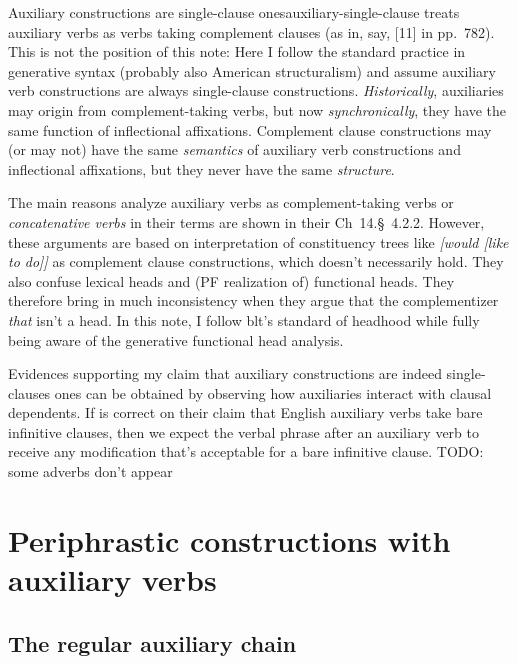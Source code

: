 \documentclass[UTF8, a4paper, oneside, scheme=plain]{ctexrep}
\newcommand*{\citesec}[1]{\S~{#1}}
\newcommand*{\citechap}[1]{Ch~{#1}}
\newcommand*{\citepage}[1]{pp.~{#1}}
\newcommand*{\citechapsec}[2]{\citechap{#1}.\citesec{#2}}
\newcommand*{\term}[1]{\emph{#1}}
\newcommand{\corpus}[1]{\emph{#1}}
\begin{document}
\begin{infobox}{Auxiliary constructions are single-clause ones}{auxiliary-single-clause}
    \citet{cgel} treats auxiliary verbs as verbs taking complement clauses 
    (as in, say, [11] in \citepage{782}).
    This is not the position of this note:
    Here I follow the standard practice in generative syntax (probably also American structuralism) 
    and assume auxiliary verb constructions are always single-clause constructions.
    \emph{Historically}, auxiliaries may origin from complement-taking verbs,
    but now \emph{synchronically}, they have the same function of inflectional affixations.
    Complement clause constructions may (or may not) have the same \emph{semantics} of 
    auxiliary verb constructions and inflectional affixations,
    but they never have the same \emph{structure}.

    The main reasons \citet{cgel} analyze auxiliary verbs as complement-taking verbs or
    \term{concatenative verbs} in their terms 
    are shown in their \citechapsec{14}{4.2.2}.
    However, these arguments are based on interpretation of constituency trees like
    \corpus{[would [like to do]]} as complement clause constructions,
    which doesn't necessarily hold.
    They also confuse lexical heads and (PF realization of) functional heads.
    They therefore bring in much inconsistency when they argue that 
    the complementizer \corpus{that} isn't a head.
    In this note, I follow \acs{blt}'s standard of headhood
    while fully being aware of the generative functional head analysis.

    Evidences supporting my claim that auxiliary constructions are indeed single-clauses ones 
    can be obtained by observing how auxiliaries interact with clausal dependents.
    If \citet{cgel} is correct on their claim that English auxiliary verbs take bare infinitive clauses,
    then we expect the verbal phrase after an auxiliary verb to receive any modification 
    that's acceptable for a bare infinitive clause.
    TODO: some adverbs don't appear 
\end{infobox}

\section{Periphrastic constructions with auxiliary verbs}\label{sec:auxiliaries}

\subsection{The regular auxiliary chain}\label{sec:auxiliary-chain}
\end{document}
